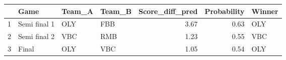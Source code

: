 \begin{table}[ht]
\centering
\begin{tabular}{rlllrrl}
  \hline
 & Game & Team\_A & Team\_B & Score\_diff\_pred & Probability & Winner \\ 
  \hline
1 & Semi final 1 & OLY & FBB & 3.67 & 0.63 & OLY \\ 
  2 & Semi final 2 & VBC & RMB & 1.23 & 0.55 & VBC \\ 
  3 & Final & OLY & VBC & 1.05 & 0.54 & OLY \\ 
   \hline
\end{tabular}
\end{table}
